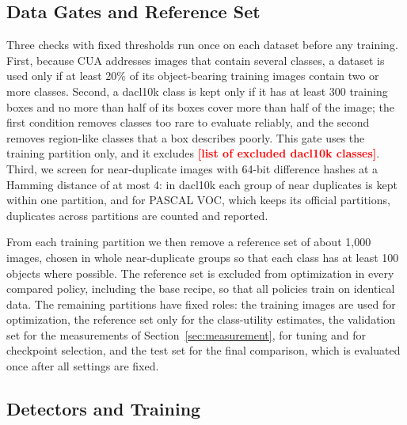 \documentclass[conference]{IEEEtran}
\newcommand{\todo}[1]{\textcolor{red}{\textbf{[#1]}}}
\begin{document}
\subsection{Data Gates and Reference Set}
\label{sec:setup_gates}

Three checks with fixed thresholds run once on each dataset before any training. First, because CUA addresses images that contain several classes, a dataset is used only if at least 20\% of its object-bearing training images contain two or more classes. Second, a dacl10k class is kept only if it has at least 300 training boxes and no more than half of its boxes cover more than half of the image; the first condition removes classes too rare to evaluate reliably, and the second removes region-like classes that a box describes poorly. This gate uses the training partition only, and it excludes \todo{list of excluded dacl10k classes}. Third, we screen for near-duplicate images with 64-bit difference hashes at a Hamming distance of at most 4: in dacl10k each group of near duplicates is kept within one partition, and for PASCAL VOC, which keeps its official partitions, duplicates across partitions are counted and reported.

From each training partition we then remove a reference set of about 1,000 images, chosen in whole near-duplicate groups so that each class has at least 100 objects where possible. The reference set is excluded from optimization in every compared policy, including the base recipe, so that all policies train on identical data. The remaining partitions have fixed roles: the training images are used for optimization, the reference set only for the class-utility estimates, the validation set for the measurements of Section~\ref{sec:measurement}, for tuning and for checkpoint selection, and the test set for the final comparison, which is evaluated once after all settings are fixed.

\subsection{Detectors and Training}
\label{sec:setup_training}
\end{document}
